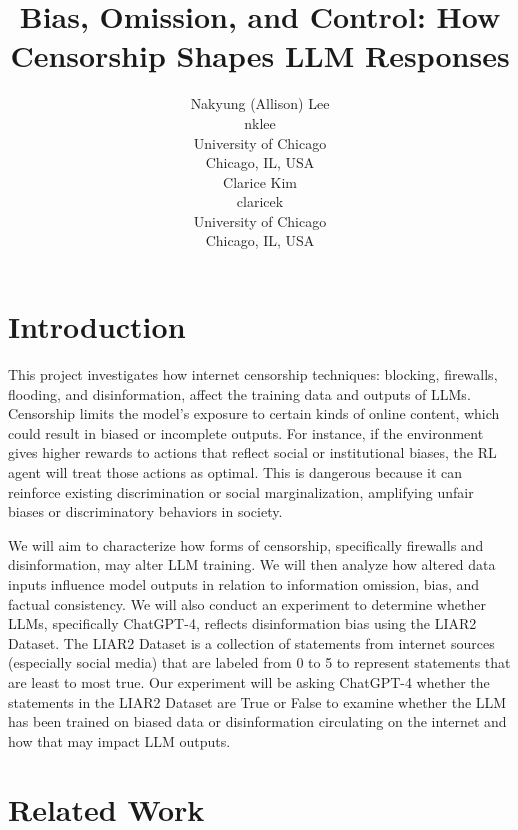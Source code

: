 \documentclass[conference=acm]{confpaper}
\title{Bias, Omission, and Control: How Censorship Shapes LLM Responses}
\author{ 
\begin{minipage}[t]{0.45\textwidth}
\centering
Nakyung (Allison) Lee \\
nklee \\
University of Chicago \\
Chicago, IL, USA
\end{minipage}%
\hfill
\begin{minipage}[t]{0.45\textwidth}
\centering
Clarice Kim \\
claricek\\
University of Chicago \\
Chicago, IL, USA
\end{minipage}
}
\begin{document}

\maketitle

\section{Introduction}
This project investigates how internet censorship techniques: blocking, firewalls, flooding, and disinformation, affect the training data and outputs of LLMs. Censorship limits the model's exposure to certain kinds of online content, which could result in biased or incomplete outputs. For instance, if the environment gives higher rewards to actions that reflect social or institutional biases, the RL agent will treat those actions as optimal. This is dangerous because it can reinforce existing discrimination or social marginalization, amplifying unfair biases or discriminatory behaviors in society.

We will aim to characterize how forms of censorship, specifically firewalls and disinformation, may alter LLM training. We will then analyze how altered data inputs influence model outputs in relation to information omission, bias, and factual consistency. We will also conduct an experiment to determine whether LLMs, specifically ChatGPT-4, reflects disinformation bias using the LIAR2 Dataset. The LIAR2 Dataset is a collection of statements from internet sources (especially social media) that are labeled from 0 to 5 to represent statements that are least to most true. Our experiment will be asking ChatGPT-4 whether the statements in the LIAR2 Dataset are True or False to examine whether the LLM has been trained on biased data or disinformation circulating on the internet and how that may impact LLM outputs.

\section{Related Work}
\end{document}
